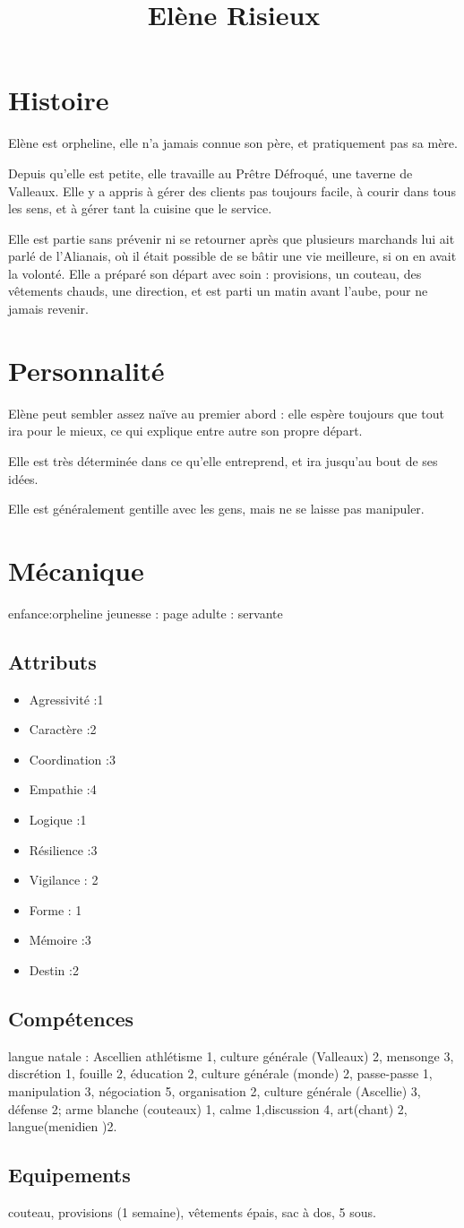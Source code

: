 \documentclass[10pt,a4paper]{article}
\title{Elène Risieux}
\begin{document}
\section{Histoire}
Elène est orpheline, elle n'a jamais connue son père, et pratiquement pas sa mère. 

Depuis qu'elle est petite, elle travaille au Prêtre Défroqué, une taverne de Valleaux. Elle y a appris à gérer des clients pas toujours facile, à courir dans tous les sens, et à gérer tant la cuisine que le service.

Elle est partie sans prévenir ni se retourner après que plusieurs marchands lui ait parlé de l'Alianais, où il était possible de se bâtir une vie meilleure, si on en avait la volonté. Elle a préparé son départ avec soin : provisions, un couteau, des vêtements chauds, une direction, et est parti un matin avant l'aube, pour ne jamais revenir.
\section{Personnalité}
Elène peut sembler assez naïve au premier abord : elle espère toujours que tout ira pour le mieux, ce qui explique entre autre son propre départ.

Elle est très déterminée dans ce qu'elle entreprend, et ira jusqu'au bout de ses idées.

Elle est généralement gentille avec les gens, mais ne se laisse pas manipuler.
\section{Mécanique}
enfance:orpheline
jeunesse : page
adulte : servante
\subsection{Attributs}
\begin{itemize}
\item Agressivité :1
\item Caractère :2
\item Coordination :3
\item Empathie :4
\item Logique :1
\item Résilience :3
\item Vigilance : 2
\item Forme : 1
\item Mémoire :3
\item Destin :2
\end{itemize}
\subsection{Compétences}
langue natale : Ascellien
athlétisme 1, culture générale (Valleaux) 2, mensonge 3, discrétion 1, fouille 2, éducation 2, culture générale (monde) 2, passe-passe 1, manipulation 3, négociation 5, organisation 2, culture générale (Ascellie) 3, défense 2; arme blanche (couteaux) 1, calme 1,discussion 4, art(chant) 2, langue(menidien )2. 
\subsection{Equipements}
couteau, provisions (1 semaine), vêtements épais, sac à dos, 5 sous.
\end{document}
